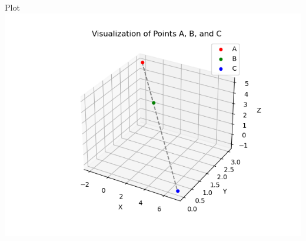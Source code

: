 \documentclass{beamer}
\begin{document}
\begin{frame}{Plot}
    \centering
    \includegraphics[width=\columnwidth, height=0.8\textheight, keepaspectratio]{figs/Fig 1.png}     
\end{frame}
\end{document}
